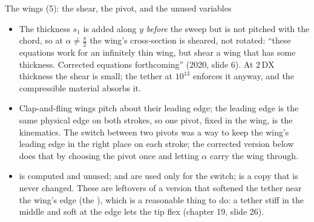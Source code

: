\documentclass[aspectratio=169,11pt]{beamer}
\begin{document}
\begin{frame}{The wings (5): the shear, the pivot, and the unused variables}
\label{fr:shear}
\footnotesize
\begin{itemize}
  \item {} The thickness $s_1$ is added along $y$ \emph{before} the sweep but is not pitched with the chord, so at $\alpha \ne \tfrac{\pi}{2}$ the wing's cross-section is sheared, not rotated: ``these equations work for an infinitely thin wing, but shear a wing that has some thickness. Corrected equations forthcoming'' (2020, slide 6). At $2\,\mathrm{DX}$ thickness the shear is small; the tether at $10^{13}$ enforces it anyway, and the compressible material absorbs it.
  \item {} Clap-and-fling wings pitch about their leading edge; the leading edge is the same physical edge on both strokes, so one pivot, fixed in the wing, is the kinematics. The switch between two pivots was a way to keep the wing's leading edge in the right place on each stroke; the corrected version below does that by choosing the pivot once and letting $\alpha$ carry the wing through.
  \item {} is computed and unused;  and  are used only for the switch;  is a copy that is never changed. These are leftovers of a version that softened the tether near the wing's edge (the ), which is a reasonable thing to do: a tether stiff in the middle and soft at the edge lets the tip flex (chapter 19, slide 26).
\end{itemize}
\end{frame}
\end{document}
